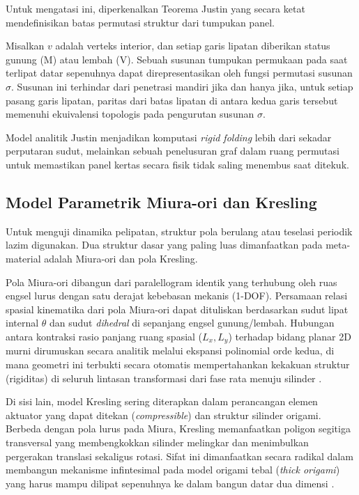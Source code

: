 Untuk mengatasi ini, diperkenalkan Teorema Justin yang secara ketat mendefinisikan batas permutasi struktur dari tumpukan panel.
\begin{teorema}
  Misalkan $v$ adalah verteks interior, dan setiap garis lipatan diberikan status gunung (M) atau lembah (V). Sebuah susunan tumpukan permukaan pada saat terlipat datar sepenuhnya dapat direpresentasikan oleh fungsi permutasi susunan $\sigma$. Susunan ini terhindar dari penetrasi mandiri jika dan hanya jika, untuk setiap pasang garis lipatan, paritas dari batas lipatan di antara kedua garis tersebut memenuhi ekuivalensi topologis pada pengurutan susunan $\sigma$.
\end{teorema}
Model analitik Justin menjadikan komputasi \textit{rigid folding} lebih dari sekadar perputaran sudut, melainkan sebuah penelusuran graf dalam ruang permutasi untuk memastikan panel kertas secara fisik tidak saling menembus saat ditekuk.

\subsection{Model Parametrik Miura-ori dan Kresling}
Untuk menguji dinamika pelipatan, struktur pola berulang atau teselasi periodik lazim digunakan. Dua struktur dasar yang paling luas dimanfaatkan pada meta-material adalah Miura-ori dan pola Kresling.

Pola Miura-ori dibangun dari paralellogram identik yang terhubung oleh ruas engsel lurus dengan satu derajat kebebasan mekanis (1-DOF). Persamaan relasi spasial kinematika dari pola Miura-ori dapat dituliskan berdasarkan sudut lipat internal $\theta$ dan sudut \textit{dihedral} di sepanjang engsel gunung/lembah. Hubungan antara kontraksi rasio panjang ruang spasial ($L_x, L_y$) terhadap bidang planar 2D murni dirumuskan secara analitik melalui ekspansi polinomial orde kedua, di mana geometri ini terbukti secara otomatis mempertahankan kekakuan struktur (rigiditas) di seluruh lintasan transformasi dari fase rata menuju silinder \parencite{hayakawa2024rigid}.

Di sisi lain, model Kresling sering diterapkan dalam perancangan elemen aktuator yang dapat ditekan (\textit{compressible}) dan struktur silinder origami. Berbeda dengan pola lurus pada Miura, Kresling memanfaatkan poligon segitiga transversal yang membengkokkan silinder melingkar dan menimbulkan pergerakan translasi sekaligus rotasi. Sifat ini dimanfaatkan secara radikal dalam membangun mekanisme infintesimal pada model origami tebal (\textit{thick origami}) yang harus mampu dilipat sepenuhnya ke dalam bangun datar dua dimensi \parencite{bershadsky2024framework}.

